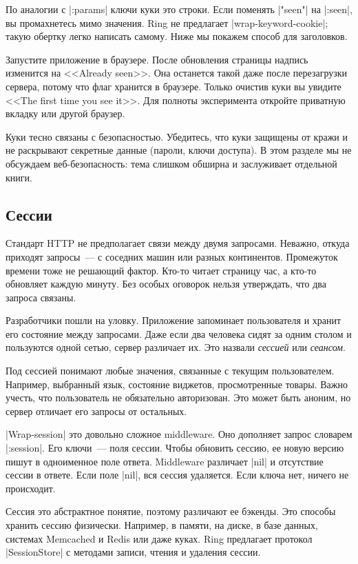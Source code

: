 По аналогии с \spverb|:params| ключи куки это строки. Если поменять
\spverb|"seen"| на \spverb|:seen|, вы промахнетесь мимо значения. Ring не
предлагает \spverb|wrap-keyword-cookie|; такую обертку легко написать
самому. Ниже мы покажем способ для заголовков.

Запустите приложение в браузере. После обновления страницы надпись изменится на
<<Already seen>>. Она останется такой даже после перезагрузки сервера, потому
что флаг хранится в браузере. Только очистив куки вы увидите <<The first time
you see it>>. Для полноты эксперимента откройте приватную вкладку или другой
браузер.

Куки тесно связаны с безопасностью. Убедитесь, что куки защищены от кражи и не
раскрывают секретные данные (пароли, ключи доступа). В этом разделе мы не
обсуждаем веб-безопасность: тема слишком обширна и заслуживает отдельной книги.

\subsection{Сессии}

Стандарт HTTP не предполагает связи между двумя запросами. Неважно, откуда
приходят запросы~--- с соседних машин или разных континентов. Промежуток времени
тоже не решающий фактор. Кто-то читает страницу час, а кто-то обновляет каждую
минуту. Без особых оговорок нельзя утверждать, что два запроса связаны.

Разработчики пошли на уловку. Приложение запоминает пользователя и хранит его
состояние между запросами. Даже если два человека сидят за одним столом и
пользуются одной сетью, сервер различает их. Это назвали \emph{сессией} или
\emph{сеансом}.

Под сессией понимают любые значения, связанные с текущим
пользователем. Например, выбранный язык, состояние виджетов, просмотренные
товары. Важно учесть, что пользователь не обязательно авторизован. Это может
быть аноним, но сервер отличает его запросы от остальных.

\spverb|Wrap-session| это довольно сложное middleware. Оно дополняет запрос
словарем \spverb|:session|. Его ключи~--- поля сессии. Чтобы обновить сессию, ее
новую версию пишут в одноименное поле ответа. Middleware различает \spverb|nil|
и отсутствие сессии в ответе. Если поле \spverb|nil|, вся сессия удаляется. Если
ключа нет, ничего не происходит.

Сессия это абстрактное понятие, поэтому различают ее бэкенды. Это способы
хранить сессию физически. Например, в памяти, на диске, в базе данных, системах
Memcached и Redis или даже куках. Ring предлагает протокол \spverb|SessionStore|
с методами записи, чтения и удаления сессии.

